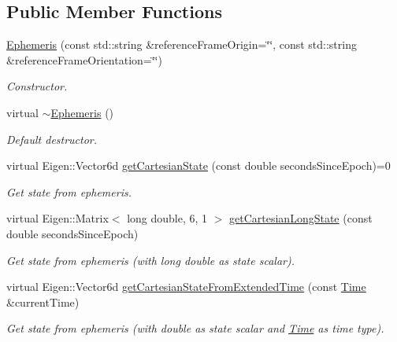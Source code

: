 \subsection*{Public Member Functions}
\begin{DoxyCompactItemize}
\item 
\hyperlink{classtudat_1_1ephemerides_1_1Ephemeris_a84b2fe561ee07d270ed3cb5e0738b6cb}{Ephemeris} (const std\+::string \&reference\+Frame\+Origin=\char`\"{}\char`\"{}, const std\+::string \&reference\+Frame\+Orientation=\char`\"{}\char`\"{})
\begin{DoxyCompactList}\small\item\em Constructor. \end{DoxyCompactList}\item 
virtual \hyperlink{classtudat_1_1ephemerides_1_1Ephemeris_ac9c54e2db132b832948e18267736fcdb}{$\sim$\+Ephemeris} ()
\begin{DoxyCompactList}\small\item\em Default destructor. \end{DoxyCompactList}\item 
virtual Eigen\+::\+Vector6d \hyperlink{classtudat_1_1ephemerides_1_1Ephemeris_a9ffa2e6b00aa190385d87266bc6ca091}{get\+Cartesian\+State} (const double seconds\+Since\+Epoch)=0
\begin{DoxyCompactList}\small\item\em Get state from ephemeris. \end{DoxyCompactList}\item 
virtual Eigen\+::\+Matrix$<$ long double, 6, 1 $>$ \hyperlink{classtudat_1_1ephemerides_1_1Ephemeris_a2b4485db49528e74903e2448e9a277ea}{get\+Cartesian\+Long\+State} (const double seconds\+Since\+Epoch)
\begin{DoxyCompactList}\small\item\em Get state from ephemeris (with long double as state scalar). \end{DoxyCompactList}\item 
virtual Eigen\+::\+Vector6d \hyperlink{classtudat_1_1ephemerides_1_1Ephemeris_a4953c48335220b8c1b46fcd6c408b2d3}{get\+Cartesian\+State\+From\+Extended\+Time} (const \hyperlink{classtudat_1_1Time}{Time} \&current\+Time)
\begin{DoxyCompactList}\small\item\em Get state from ephemeris (with double as state scalar and \hyperlink{classtudat_1_1Time}{Time} as time type). \end{DoxyCompactList}\item 

\end{DoxyCompactItemize}
